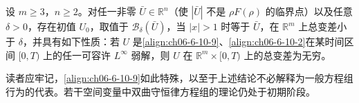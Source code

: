 \documentclass[../../main.tex]{subfiles}
\begin{document}
\begin{theorem}\label{theorem:ch06-6-10-4}
设 $m\geqslant 3$，$n\geqslant 2$。对任一非零 $\bar{U}\in\mathbb{R}^{n}$（使 $|\bar{U}|$ 不是 $\rho F(\rho)$ 的临界点）以及任意 $\delta>0$，存在初值 $U_{0}$，取值于 $\mathscr{B}_{\delta}(\bar{U})$，当 $|x|>1$ 时等于 $\bar{U}$，在 $\mathbb{R}^{m}$ 上总变差小于 $\delta$，并具有如下性质：若 $U$ 是\eqref{align:ch06-6-10-9}、\eqref{align:ch06-6-10-2}在某时间区间 $[0,T)$ 上的任一可容许 $L^{\infty}$ 弱解，则 $U$ 在 $\mathbb{R}^{m}\times[0,T)$ 上的总变差为无穷。
\end{theorem}

读者应牢记，\eqref{align:ch06-6-10-9}如此特殊，以至于上述结论不必解释为一般方程组行为的代表。若干空间变量中双曲守恒律方程组的理论仍处于初期阶段。
\end{document}
